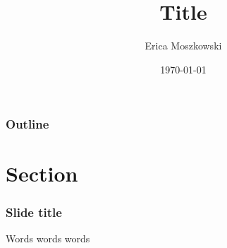 \documentclass{mybeamer}
\begin{document}
\title{Title}
\author{Erica Moszkowski}
\date{\today}

\begin{frame}
\titlepage
\end{frame}

\begin{frame}
\frametitle{Outline}
\tableofcontents
\end{frame}

\section{Section}
\begin{frame}[fragile]  %
  \frametitle{Slide title}
  Words words words
\end{frame}
\end{document}
